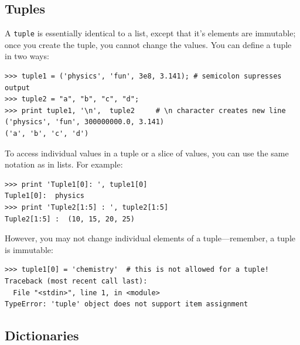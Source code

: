 \subsection{Tuples}
\label{sec:tuples}
A \texttt{tuple} is essentially identical to a list, except that it's elements are immutable; once you create the tuple, you cannot change the values. You can define a tuple in two ways:
\begin{lstlisting}[frame=none]
>>> tuple1 = ('physics', 'fun', 3e8, 3.141); # semicolon supresses output
>>> tuple2 = "a", "b", "c", "d";   
>>> print tuple1, '\n',  tuple2 	# \n character creates new line
('physics', 'fun', 300000000.0, 3.141)
('a', 'b', 'c', 'd')
\end{lstlisting}
To access individual values in a tuple or a slice of values, you can use the same notation as in lists. For example:
\begin{lstlisting}[frame=none]
>>> print 'Tuple1[0]: ', tuple1[0]
Tuple1[0]:  physics
>>> print 'Tuple2[1:5] : ', tuple2[1:5]
Tuple2[1:5] :  (10, 15, 20, 25)
\end{lstlisting}
However, you may not change individual elements of a tuple---remember, a tuple is immutable:
\begin{lstlisting}[frame=none]
>>> tuple1[0] = 'chemistry'  # this is not allowed for a tuple!
Traceback (most recent call last):
  File "<stdin>", line 1, in <module>
TypeError: 'tuple' object does not support item assignment
\end{lstlisting}


\subsection{Dictionaries}
\label{sec:dictionaries}

